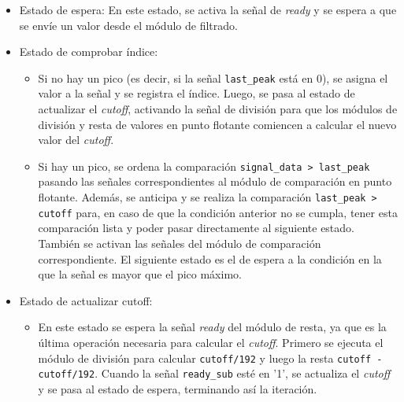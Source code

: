 \begin{itemize}
    \item Estado de espera: En este estado, se activa la señal de \textit{ready} y se espera a que se envíe un valor desde el módulo de filtrado.
    \item Estado de comprobar índice:
    \begin{itemize}
        \item Si no hay un pico (es decir, si la señal \texttt{last\_peak} está en 0), se asigna el valor a la señal y se registra el índice. Luego, se pasa al estado de actualizar el \textit{cutoff}, activando la señal de división para que los módulos de división y resta de valores en punto flotante comiencen a calcular el nuevo valor del \textit{cutoff}.
        \item Si hay un pico, se ordena la comparación \texttt{signal\_data > last\_peak} pasando las señales correspondientes al módulo de comparación en punto flotante. Además, se anticipa y se realiza la comparación \texttt{last\_peak > cutoff} para, en caso de que la condición anterior no se cumpla, tener esta comparación lista y poder pasar directamente al siguiente estado. También se activan las señales del módulo de comparación correspondiente. El siguiente estado es el de espera a la condición en la que la señal es mayor que el pico máximo.
    \end{itemize}
    
    \item Estado de actualizar cutoff: 
    \begin{itemize}
        \item En este estado se espera la señal \textit{ready} del módulo de resta, ya que es la última operación necesaria para calcular el \textit{cutoff}. Primero se ejecuta el módulo de división para calcular \texttt{cutoff/192} y luego la resta \texttt{cutoff - cutoff/192}. Cuando la señal \texttt{ready\_sub} esté en '1', se actualiza el \textit{cutoff} y se pasa al estado de espera, terminando así la iteración.
    \end{itemize}


\end{itemize}
